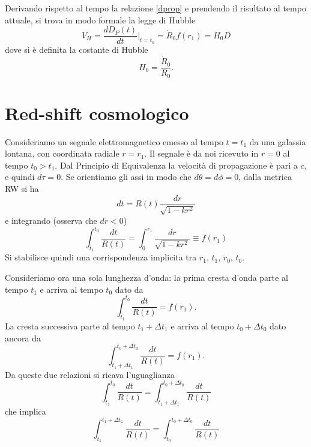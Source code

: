 Derivando rispetto al tempo la relazione \eqref{dprop} e prendendo il risultato
al tempo attuale, si trova in modo formale la legge di Hubble
\begin{equation}
  V_H = \frac {dD_P(t)}{dt}|_{t=t_0} = \dot{R}_0 f(r_1) = H_0 D
\end{equation}
dove si è definita la costante di Hubble
\begin{equation}
  H_0=\frac{\dot{R}_0}{R_0}.
\end{equation}

\section{Red-shift cosmologico}

Consideriamo un segnale elettromagnetico emesso al tempo $t=t_1$ da una galassia
lontana, con coordinata radiale $r=r_1$.  Il segnale è da noi ricevuto in $r=0$
al tempo $t_0>t_1$.  Dal Principio di Equivalenza la velocità di propagazione è
pari a $c$, e quindi $d \tau= 0$.  Se orientiamo gli assi in modo che $d \theta
= d \phi=0$, dalla metrica RW si ha
\begin{equation}
  dt = R(t) \frac{dr}{\sqrt{1-kr^2}}
\end{equation}
e integrando (osserva che $dr<0$)
\begin{equation}
  \int_{t_1}^{t_0} \frac{dt}{R(t)} = \int_0^{r_1} \frac{dr}{\sqrt{1-kr^2}}
  \equiv f(r_1)
\end{equation}
Si stabilisce quindi una corrispondenza implicita tra $r_1$, $t_1$, $r_0$,
$t_0$.

Consideriamo ora una sola lunghezza d'onda: la prima cresta d'onda parte al
tempo $t_1$ e arriva al tempo $t_0$ dato da
\begin{equation}
  \int_{t_1}^{t_0} \frac{dt}{R(t)} =  f(r_1).
\end{equation}
La cresta successiva parte al tempo $t_1+\Delta t_1$ e arriva al tempo $t_0+
\Delta t_0$ dato ancora da
\begin{equation}
  \int_{t_1+ \Delta t_1}^{t_0+ \Delta t_0} \frac{dt}{R(t)} =  f(r_1).
\end{equation}
Da queste due relazioni si ricava l'uguaglianza
\begin{equation}
  \int_{t_1}^{t_0} \frac{dt}{R(t)} =  \int_{t_1+ \Delta t_1}^{t_0+ \Delta t_0}
  \frac{dt}{R(t)}
\end{equation}
che implica
\begin{equation}
  \int_{t_1}^{t_1+\Delta t_1} \frac{dt}{R(t)} =  \int_{t_0}^{t_0+ \Delta t_0}
  \frac{dt}{R(t)}
  \label{169}
\end{equation}

